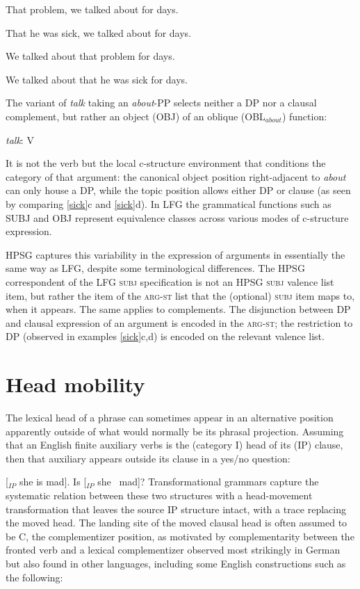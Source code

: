 \documentclass[output=paper
                ,modfonts
                ,nonflat
	        ,collection
	        ,collectionchapter
	        ,collectiontoclongg
 	        ,biblatex
                ,babelshorthands
                ,newtxmath
                ,draftmode
                ,colorlinks, citecolor=brown
]{./langsci/langscibook}
\begin{document}
\eal 
 \label{sick}
\ex That problem, we talked about for days.

\ex  That he was sick, we talked about for days.

\ex We talked about that problem for days.

\ex *We talked about that he was sick for days.

\zl
The variant of \textit{talk} taking an \textit{about}-PP selects neither a DP nor a clausal complement, but rather an object (OBJ) of an oblique (OBL$_{about}$) function:  

\eal 
{{\it talk}\/: V}\qquad{}    
\zl

\noindent
It is not the verb but the local c-structure environment that conditions the category of that argument: the canonical object position right-adjacent to \textit{about} can only house a DP, while the topic position allows either DP or clause (as seen by comparing \ref{sick}c and \ref{sick}d).  In LFG the grammatical functions such as SUBJ and OBJ represent equivalence classes across various modes of c-structure expression.  

HPSG captures this variability in the expression of arguments in essentially the same way as LFG, despite some terminological differences.  The HPSG correspondent of the LFG \textsc{subj} specification is not an HPSG \textsc{subj} valence list item, but rather the item of the \textsc{arg-st} list that the (optional) \textsc{subj}  item maps to, when it appears.  The same applies to complements.  The disjunction between DP and clausal expression of an argument is encoded in the \textsc{arg-st;} the restriction to DP (observed in examples \ref{sick}c,d) is encoded on the relevant valence list.  


\section{Head mobility} 
The lexical head of a phrase can sometimes appear in an alternative position apparently outside of what would normally be its phrasal projection.  Assuming that an English finite auxiliary verbs is the (category I) head of its (IP) clause, then that auxiliary appears outside its clause in a yes/no question:

\eal 
\label{mad}
\ex {} [$_{IP}$ she is mad].
\ex  Is   [$_{IP}$ she \gap\ mad]?
\zl
Transformational grammars capture the systematic relation between these two structures with a head-movement transformation that leaves the source IP structure intact, with a trace replacing the moved head.  The landing site of the moved clausal head is often assumed to be C, the complementizer position, as motivated by complementarity between the fronted verb and a lexical complementizer observed most strikingly in German but also found in other languages, including some English constructions such as the following:  
\end{document}
